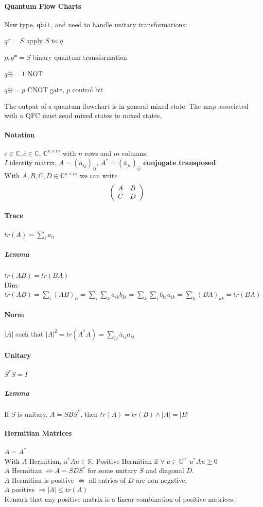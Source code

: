\documentclass[10pt]{report}
\begin{document}
\paragraph{Quantum Flow Charts} New type, \texttt{qbit}, and need to handle unitary transformations:
\begin{list}{}{}
	\item $q*=S$ apply $S$ to $q$
	\item $p,q*=S$ binary quantum transformation
	\item $q\oplus =1$ NOT
	\item $q\oplus =p$ CNOT gate, $p$ control bit
\end{list}
The output of a quantum flowchart is in general mixed state. The map associated with a QFC must send mixed states to mixed states.
\paragraph{Notation} $c\in \mathbb{C}, \overline{c} \in \mathbb{C}$, $\mathbb{C}^{n\times m}$ with $n$ rows and $m$ columns.\\
$I$ identity matrix, $A= (a_{ij})_{ij}$, $A^* = (\overline{a}_{ji})_{ij}$ \textbf{conjugate transposed}\\
With $A,B,C,D\in \mathbb{C}^{n\times m}$ we can write
$$\left(\begin{array}{c c}
A & B \\ C & D
\end{array}\right)$$
\paragraph{Trace} $tr(A) = \sum_i a_{ii}$
\subparagraph{Lemma} $tr(AB) = tr(BA)$\\
Dim: $tr(AB) = \sum_i (AB)_{ii} = \sum_i \sum_k a_{ik}b_{ki} = \sum_k\sum_i b_{ki}a_{ik} = \sum_k (BA)_{kk} = tr(BA)$
\paragraph{Norm} $|A|$ such that $|A|^2 = tr(A^*A) = \sum_{ij}\overline{a}_{ij}a_{ij}$
\paragraph{Unitary} $S^*S = I$
\subparagraph{Lemma} If $S$ is unitary, $A = SBS^*$, then $tr(A) = tr(B)\wedge |A| = |B|$
\paragraph{Hermitian Matrices} $A = A^*$\\
With $A$ Hermitian, $u^*Au\in \mathbb{R}$. Positive Hermitian if $\forall\:u\in \mathbb{C}^n\:\:u^*Au \geq 0$\\
$A$ Hermitian $\Leftrightarrow A = SDS^*$ for some unitary $S$ and diagonal $D$.\\
$A$ Hermitian is positive $\Leftrightarrow$ all entries of $D$ are non-negative.\\
$A$ positive $\Rightarrow |A| \leq tr(A)$\\
Remark that any positive matrix is a linear combination of positive matrices.
\end{document}
